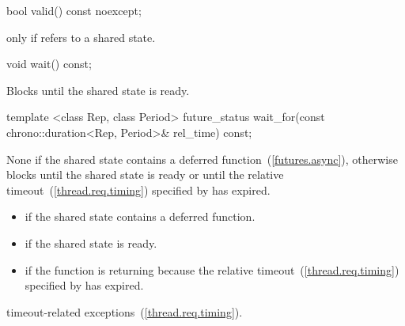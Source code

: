 %
%
\begin{itemdecl}
bool valid() const noexcept;
\end{itemdecl}

\begin{itemdescr}
\pnum
\returns {} only if  refers to a shared state.
\end{itemdescr}

%
%
\begin{itemdecl}
void wait() const;
\end{itemdecl}

\begin{itemdescr}
\pnum
\effects
Blocks until the shared state is ready.
\end{itemdescr}

%
%
\begin{itemdecl}
template <class Rep, class Period>
  future_status wait_for(const chrono::duration<Rep, Period>& rel_time) const;
\end{itemdecl}

\begin{itemdescr}
\pnum
\effects
None if the shared state contains a deferred function~(\ref{futures.async}),
otherwise
blocks until the shared state is ready or until
the relative timeout~(\ref{thread.req.timing}) specified by
 has expired.

\pnum
\returns

\begin{itemize}
\item {} if the shared state contains a deferred
function.

\item {} if the shared state is ready.

\item {} if the function is returning because the
relative timeout~(\ref{thread.req.timing})
specified by  has expired.
\end{itemize}

\pnum
\throws
timeout-related exceptions~(\ref{thread.req.timing}).
\end{itemdescr}

